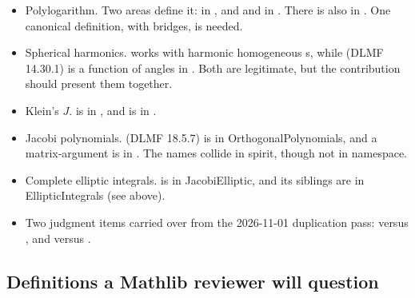 \documentclass[11pt,a4paper]{article}
\begin{document}
\begin{itemize}
  \item Polylogarithm. Two areas define it:  in ,
    and  and  in . There is also
     in . One canonical definition, with bridges,
    is needed.
  \item Spherical harmonics.  works with harmonic
    homogeneous s, while  (DLMF 14.30.1) is a
    function of angles in . Both are legitimate, but the
    contribution should present them together.
  \item Klein's \(J\).  is in
    , and
     is in .
  \item Jacobi polynomials.  (DLMF 18.5.7) is in OrthogonalPolynomials,
    and a matrix-argument  is in . The names
    collide in spirit, though not in namespace.
  \item Complete elliptic integrals.  is in JacobiElliptic, and its
    siblings are in EllipticIntegrals (see above).
  \item Two judgment items carried over from the 2026-11-01 duplication pass:
     versus , and  versus
    .
\end{itemize}

\subsection{Definitions a Mathlib reviewer will question}
\end{document}
